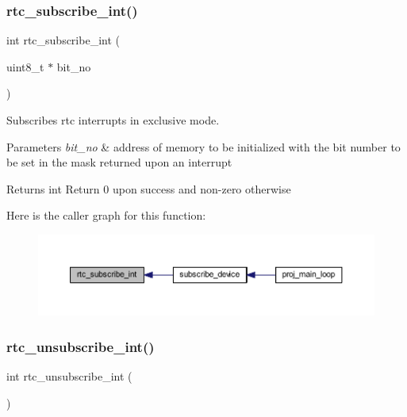 \subsubsection{\texorpdfstring{rtc\+\_\+subscribe\+\_\+int()}{rtc\_subscribe\_int()}}
{\footnotesize\ttfamily int rtc\+\_\+subscribe\+\_\+int (\begin{DoxyParamCaption}\item[{uint8\+\_\+t $\ast$}]{bit\+\_\+no }\end{DoxyParamCaption})}



Subscribes rtc interrupts in exclusive mode. 


\begin{DoxyParams}{Parameters}
{\em bit\+\_\+no} & address of memory to be initialized with the bit number to be set in the mask returned upon an interrupt \\
\hline
\end{DoxyParams}
\begin{DoxyReturn}{Returns}
int Return 0 upon success and non-\/zero otherwise 
\end{DoxyReturn}
Here is the caller graph for this function\+:\nopagebreak
\begin{figure}[H]
\begin{center}
\leavevmode
\includegraphics[width=350pt]{group__rtc_ga5171a9c0f54940fe60f7500896afcc86_icgraph}
\end{center}
\end{figure}
\mbox{\label{group__rtc_gab8f17bf5280c908c8b199a90fefcc758}} 
\subsubsection{\texorpdfstring{rtc\+\_\+unsubscribe\+\_\+int()}{rtc\_unsubscribe\_int()}}
{\footnotesize\ttfamily int rtc\+\_\+unsubscribe\+\_\+int (\begin{DoxyParamCaption}{ }\end{DoxyParamCaption})}



